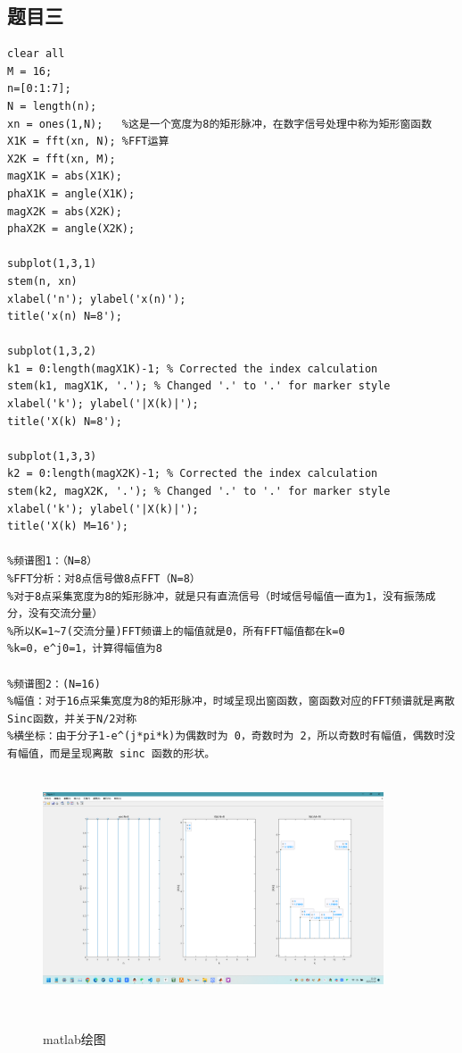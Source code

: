 \documentclass[12pt,hyperref,a4paper,UTF8]{ctexart}
\begin{document}
\subsection{题目三}


\begin{lstlisting}[style=matlab, caption={ MATLAB实现代码}]
clear all
M = 16;
n=[0:1:7];
N = length(n);
xn = ones(1,N);   %这是一个宽度为8的矩形脉冲，在数字信号处理中称为矩形窗函数
X1K = fft(xn, N); %FFT运算
X2K = fft(xn, M);
magX1K = abs(X1K);
phaX1K = angle(X1K);
magX2K = abs(X2K);
phaX2K = angle(X2K);

subplot(1,3,1)
stem(n, xn)
xlabel('n'); ylabel('x(n)');
title('x(n) N=8');

subplot(1,3,2)
k1 = 0:length(magX1K)-1; % Corrected the index calculation
stem(k1, magX1K, '.'); % Changed '.' to '.' for marker style
xlabel('k'); ylabel('|X(k)|');
title('X(k) N=8');

subplot(1,3,3)
k2 = 0:length(magX2K)-1; % Corrected the index calculation
stem(k2, magX2K, '.'); % Changed '.' to '.' for marker style
xlabel('k'); ylabel('|X(k)|');
title('X(k) M=16');

%频谱图1：（N=8）
%FFT分析：对8点信号做8点FFT（N=8）
%对于8点采集宽度为8的矩形脉冲，就是只有直流信号（时域信号幅值一直为1，没有振荡成分，没有交流分量）
%所以K=1~7(交流分量)FFT频谱上的幅值就是0，所有FFT幅值都在k=0
%k=0，e^j0=1，计算得幅值为8

%频谱图2：(N=16)
%幅值：对于16点采集宽度为8的矩形脉冲，时域呈现出窗函数，窗函数对应的FFT频谱就是离散Sinc函数，并关于N/2对称
%横坐标：由于分子1-e^(j*pi*k)为偶数时为 0，奇数时为 2，所以奇数时有幅值，偶数时没有幅值，而是呈现离散 sinc 函数的形状。
\end{lstlisting}



\begin{figure}[H] %
        \centering
        \includegraphics[width=0.9\textwidth]{figures/303.png} %
        \caption{matlab绘图} %
        \label{fig:example} %
\end{figure}
\end{document}
